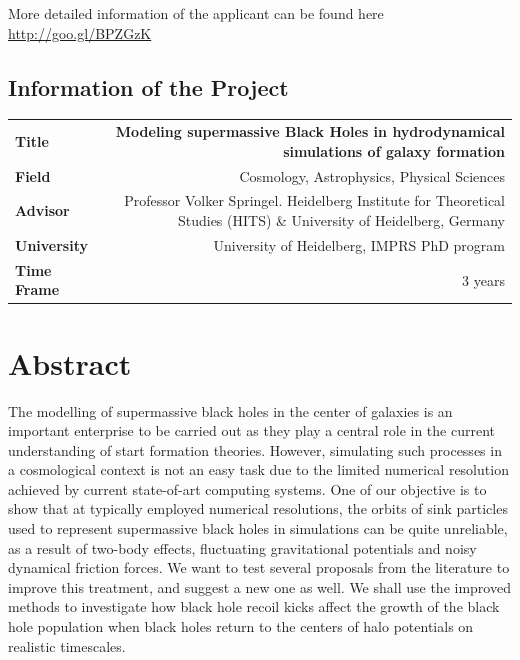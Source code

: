 \documentclass[a4,useAMS,usenatbib,usegraphicx,12pt]{article}
\begin{document}
\vspace{10pt}

More detailed information of the applicant can be found here \url{http://goo.gl/BPZGzK}

\vspace{15pt}  

\subsection*{Information of the Project}
\begin{tabular}{L!{\VRule}R}
\bf Title		& \bf Modeling supermassive Black Holes in hydrodynamical simulations of
				galaxy formation\\
\bf Field		& Cosmology, Astrophysics, Physical Sciences \\
\bf Advisor	& Professor Volker Springel. Heidelberg Institute for Theoretical Studies (HITS) 
\& University of Heidelberg, Germany \\
\bf University	& University of Heidelberg, IMPRS PhD program \\
\bf Time Frame	& 3 years \\
\end{tabular}
\normalsize


\section{Abstract}


The modelling of supermassive black holes in the center of galaxies is an important 
enterprise to be carried out as they play a central role in the current understanding
of start formation theories. However, simulating such processes in a cosmological 
context is not an easy task due to the limited numerical resolution achieved by 
current state-of-art computing systems. One of our objective is to show that at 
typically employed numerical resolutions, the orbits of sink particles used to 
represent supermassive black holes in simulations can be quite unreliable, as a 
result of two-body effects, fluctuating gravitational potentials and noisy 
dynamical friction forces. We want to test several proposals from the literature 
to improve this treatment, and suggest a new one as well. We shall use the 
improved methods to investigate how black hole recoil kicks affect the growth of 
the black hole population when black holes return to the centers of halo potentials 
on realistic timescales.
\end{document}
